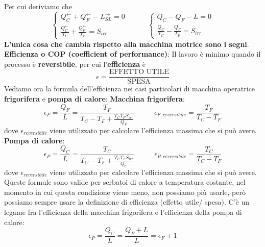 Per cui deriviamo che
\[
    \begin{cases}
        Q_C^\leftarrow  + Q_F^\leftarrow  - L_{SL}^\rightarrow  = 0\\
        \frac{Q_C^\leftarrow}{T_C} + \frac{Q_F^\leftarrow}{T_F} = S_{irr}
    \end{cases} \;\;\;\;\;\;\;\;\;\; \begin{cases}
        Q_C - Q_F - L = 0\\
        \frac{Q_C}{T_C} - \frac{Q_F}{T_F} = S_{irr}
    \end{cases}
\]
\textbf{L'unica cosa che cambia rispetto alla macchina motrice sono i segni}.\newline
\newline
\textbf{Efficienza o COP (coefficient of performance)}:\newline
Il lavoro è minimo quando il processo è \textbf{reversibile}, per cui l'\textbf{efficienza} è
\[
    \epsilon = \frac{\text{EFFETTO UTILE}}{\text{SPESA}}
\]
Vediamo ora la formula dell'efficienza nei casi particolari di macchina operatrice \textbf{frigorifera} e \textbf{pompa di calore}:\newline
\textbf{Macchina frigorifera}:
\[
    \epsilon_F = \frac{Q_F}{L} = \frac{T_F}{T_C - T_F + \frac{T_CT_FS_{irr}}{Q_F}} \;\;\;\;\;\;\;\;\;\; \epsilon_{F,reversibile} = \frac{T_F}{T_C-T_F}
\]
dove $\epsilon_{reversibile}$ viene utilizzato per calcolare l'efficienza massima che si può avere.\newline
\textbf{Pompa di calore}:
\[
    \epsilon_P = \frac{Q_C}{L} = \frac{T_C}{T_C - T_F + \frac{T_CT_FS_{irr}}{Q_C}} \;\;\;\;\;\;\;\;\;\; \epsilon_{P,reversibile} = \frac{T_C}{T_C-T_F}
\]
dove $\epsilon_{reversibile}$ viene utilizzato per calcolare l'efficienza massima che si può avere.\newline
\newline
Queste formule sono valide per serbatoi di calore a temperatura costante, nel momento in cui questa condizione viene meno, non possiamo più usarle, però possiamo sempre usare la definizione di efficienza (effetto utile/ spesa).
\newline
\newline
C'è un legame fra l'efficienza della macchina frigorifera e l'efficienza della pompa di calore:
\[
    \epsilon_P = \frac{Q_C}{L} = \frac{Q_F+L}{L} = \epsilon_F + 1
\]
